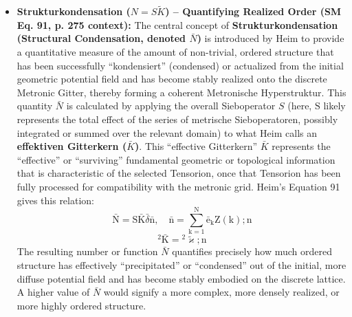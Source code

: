 \documentclass[12pt]{article}
\newcommand{\q}[1]{\enquote{#1}}
\newcommand{\metronintegral}{S} %
\begin{document}
\begin{itemize}
    \item \textbf{Strukturkondensation (\( N = \metronintegral\tilde{K} \)) – Quantifying Realized Order (SM Eq. 91, p. 275 context):}
    The central concept of \textbf{Strukturkondensation (Structural Condensation, denoted \( \bar{N} \))} is introduced by Heim to provide a quantitative measure of the amount of non-trivial, ordered structure that has been successfully \q{kondensiert} (condensed) or actualized from the initial geometric potential field and has become stably realized onto the discrete Metronic Gitter, thereby forming a coherent Metronische Hyperstruktur. This quantity \( \bar{N} \) is calculated by applying the overall Sieboperator \( \metronintegral \) (here, \( \mathrm{S} \) likely represents the total effect of the series of metrische Sieboperatoren, possibly integrated or summed over the relevant domain) to what Heim calls an \textbf{effektiven Gitterkern (\( \bar{K} \))}. This \q{effective Gitterkern} \( \bar{K} \) represents the \q{effective} or \q{surviving} fundamental geometric or topological information that is characteristic of the selected Tensorion, once that Tensorion has been fully processed for compatibility with the metronic grid. Heim's Equation 91 gives this relation:
    \begin{equation}
    \bar{\mathrm{N}} = \mathrm{S}\bar{\mathrm{K}}\bar{\delta}\bar{\mathrm{n}}, \quad \bar{\mathrm{n}} = \sum_{\mathrm{k}=1}^\mathrm{N} \bar{\mathrm{e}}_\mathrm{k} \mathrm{Z}(\mathrm{k});\mathrm{n} \tag{91}
    \label{eq:original_strukturkondensation}
    \end{equation}
    \begin{equation}
    {}^2\bar{\mathrm{K}} = {}^2\tilde{\varkappa};\mathrm{n} \tag{91a}
    \end{equation}
    The resulting number or function \( \bar{N} \) quantifies precisely how much ordered structure has effectively \q{precipitated} or \q{condensed} out of the initial, more diffuse potential field and has become stably embodied on the discrete lattice. A higher value of \( \bar{N} \) would signify a more complex, more densely realized, or more highly ordered structure.


\end{itemize}
\end{document}
